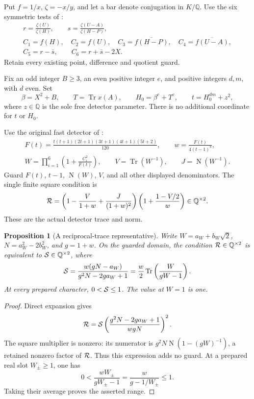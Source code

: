 \documentclass[11pt,a4paper]{article}
\newtheorem{proposition}[theorem]{Proposition}
\newcommand{\Q}{\mathbb Q}\newcommand{\Z}{\mathbb Z}
\DeclareMathOperator{\Tr}{Tr}
\DeclareMathOperator{\Nm}{N}
\begin{document}
Put \(f=1/x\), \(\zeta=-x/y\), and let a bar denote conjugation in \(K/\Q\).
Use the six symmetric tests of \cite{Reweighted}:
\begin{equation}\label{eq:tests}
 \begin{gathered}
 r=\frac{\zeta(U)}{\zeta(H)},\qquad
 s=\frac{\zeta(U-A)}{\zeta(H-P)},\\
 C_1=f(H),\quad C_2=f(U),\quad
 C_3=\overline{f(H-P)},\quad C_4=\overline{f(U-A)},\\
 C_5=r-\bar s,\qquad C_6=r+\bar s-2X.
 \end{gathered}
\end{equation}
Retain every existing point, difference and quotient guard.

Fix an odd integer \(B\ge3\), an even positive integer \(e\), and positive
integers \(d,m\), with \(d\) even. Set
\begin{equation}\label{eq:argument}
 \beta=X^2+B,\qquad T=\Tr x(A),\qquad
 H_0=\beta^e+T^e,\qquad t=H_0^{dm}+z^2,
\end{equation}
where \(z\in\Q\) is the sole free detector parameter.
There is no additional coordinate for \(t\) or \(H_0\).

Use the original fast detector of \cite{Reweighted}:
\begin{equation}\label{eq:detector}
 \begin{gathered}
 F(t)=\frac{t(t+1)(2t+1)(3t+1)(4t+1)(5t+2)}{120},
 \qquad w=\frac{F(t)}{4(t-1)^8},\\
 W=\prod_{i=1}^6\left(1+\frac{C_i^2}{F(t)}\right),\qquad
 V=\Tr(W^{-1}),\qquad J=\Nm(W^{-1}).
 \end{gathered}
\end{equation}
Guard \(F(t)\), \(t-1\), \(\Nm(W)\), \(V\), and all other displayed
denominators. The single finite square condition is
\begin{equation}\label{eq:square}
 {\cal R}=
 \left(1-\frac{V}{1+w}+\frac{J}{(1+w)^2}\right)
 \left(1+\frac{1-V/2}{w}\right)\in\Q^{\times2}.
\end{equation}
These are the actual detector trace and norm.

\begin{proposition}[A reciprocal-trace representative]\label{prop:reciprocal}
Write \(W=a_W+b_W\sqrt2\), \(N=a_W^2-2b_W^2\), and \(g=1+w\).
On the guarded domain, the condition \({\cal R}\in\Q^{\times2}\)
is equivalent to \({\cal S}\in\Q^{\times2}\), where
\[
 {\cal S}=\frac{w(gN-a_W)}{g^2N-2ga_W+1}
       =\frac w2\Tr\left(\frac{W}{gW-1}\right).
\]
At every prepared character, \(0<{\cal S}\le1\).
The value at \(W=1\) is one.
\end{proposition}
\begin{proof}
Direct expansion gives
\[
 {\cal R}={\cal S}
       \left(\frac{g^2N-2ga_W+1}{wgN}\right)^2.
\]
The square multiplier is nonzero: its numerator is
\(g^2N\operatorname{N}(1-(gW)^{-1})\), a retained nonzero factor
of \({\cal R}\). Thus this expression adds no guard.
At a prepared real slot \(W_\pm\ge1\), one has
\[
 0<\frac{wW_\pm}{gW_\pm-1}
       =\frac w{g-1/W_\pm}\le1.
\]
Taking their average proves the asserted range.
\end{proof}
\end{document}
